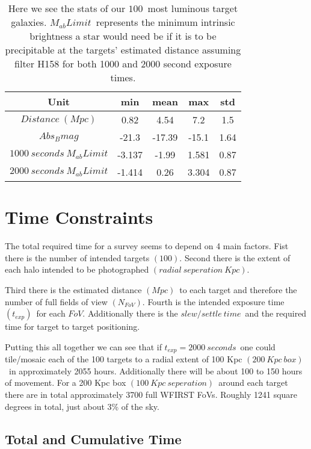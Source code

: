 \documentclass[11pt,a4paper,fleqn,notitlepage,oneside]{article}
\begin{document}
			\begin{table}[H]\centering
				\label{tab:target_galaxies}
				\begin{tabular}{||c|cccc||}
					\hline 
					Unit & min & mean & max & std \\
					\midrule[1.5pt]
					$Distance\ (Mpc)$ & 0.82 & 4.54 & 7.2 & 1.5 \\
					$Abs_{B}mag$ & -21.3 & -17.39 & -15.1 & 1.64 \\
					$1000\ seconds\ M_{ab}Limit$ & -3.137 & -1.99 & 1.581 & 0.87 \\
					$2000\ seconds\ M_{ab}Limit$ & -1.414 & 0.26 & 3.304 & 0.87 \\
					\hline
				\end{tabular}
				\caption{
					Here we see the stats of our $100$\ most luminous target galaxies.
					$M_{ab}Limit$\ represents the minimum intrinsic brightness a star would need be if it is to be precipitable at the targets' estimated distance assuming filter H158 for both 1000 and 2000 second exposure times.
					}
			\end{table}

	\section[Observation Time]{Time Constraints} %
		\label{sec:time_constraints}
		The total required time for a survey seems to depend on 4 main factors.
		Fist there is the number of intended targets $(100)$.
		Second there is the extent of each halo intended to be photographed $(radial\ seperation\ Kpc)$.

		Third there is the estimated distance $(Mpc)$\ to each target and therefore the number of full fields of view $(N_{FoV})$.
		Fourth is the intended exposure time $(t_{exp})$\ for each $FoV$.
		Additionally there is the $slew/settle\ time$\ and the required time for target to target positioning.

		Putting this all together we can see that if $t_{exp}=2000\ seconds$\ one could tile/mosaic each of the 100 targets to a radial extent of 100 Kpc $(200\ Kpc\ box)$\ in approximately 2055 hours.
		Additionally there will be about 100 to 150 hours of movement.
		For a 200 Kpc box $(100\ Kpc\ seperation)$\ around each target there are in total approximately 3700 full WFIRST FoVs.
		Roughly 1241 square degrees in total, just about 3\% of the sky.

		\subsection{Total and Cumulative Time} %
			\label{sub:total_and_cumulative_time}
\end{document}
